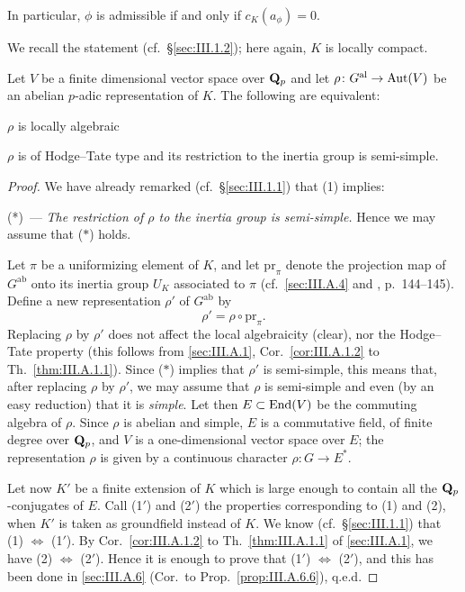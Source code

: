 \begin{exercises}
\begin{nlist}
In particular, $\phi$ is admissible if and only if $c_K(a_\phi)=0$.

\end{nlist}
\end{exercises}


We recall the statement (cf.~\S\ref{sec:III.1.2}); here again, $K$ is
locally compact.

\begin{theorem}[3]\label{thm:III.A.7.3}
Let $V$ be a finite dimensional vector space over $\mathbf{Q}_p$ and let
$\rho\colon G^{\mathrm{al}}\to\mathrm{Aut}(V)$ be an abelian $p$-adic
representation of $K$.  The following are equivalent:
\begin{nlist}
\item[\emph{(1)}] $\rho$ is locally algebraic
\item[\emph{(2)}] $\rho$ is of Hodge--Tate type and its restriction to
the inertia group is semi-simple.
\end{nlist}
\end{theorem}

\begin{proof}
We have already remarked (cf.~\S\ref{sec:III.1.1}) that (1) implies:

{\upshape(*)\ --- \emph{The restriction of $\rho$ to the inertia group
is semi-simple.}}  Hence we may assume that ($*$) holds.

Let $\pi$ be a uniformizing element of $K$, and let
$\mathrm{pr}_\pi$ denote the projection map of $G^{\mathrm{ab}}$ onto
its inertia group $U_K$ associated to $\pi$ (cf.~\ref{sec:III.A.4} and
\cite{cassels-frohlich}, p.~144--145).  Define a new representation
$\rho'$ of $G^{\mathrm{ab}}$ by
\[
\rho'=\rho\circ\mathrm{pr}_\pi.
\]
Replacing $\rho$ by $\rho'$ does not affect the local algebraicity
(clear), nor the Hodge--Tate property (this follows from
\ref{sec:III.A.1}, Cor.~\ref{cor:III.A.1.2} to
Th.~\ref{thm:III.A.1.1}).  Since ($*$) implies that $\rho'$ is
semi-simple, this means that, after replacing $\rho$ by $\rho'$, we may
assume that $\rho$ is semi-simple and even (by an easy reduction) that
it is \emph{simple}.  Let then $E\subset\mathrm{End}(V)$ be the commuting
algebra of $\rho$.  Since $\rho$ is abelian and simple, $E$ is a
commutative field, of finite degree over $\mathbf{Q}_p$, and $V$ is a
one-dimensional vector space over $E$; the representation $\rho$ is
given by a continuous character $\rho\colon G\to E^*$.

Let now $K'$ be a finite extension of $K$ which is large enough to
contain all the $\mathbf{Q}_p$-conjugates of $E$.  Call (1$'$) and (2$'$) the
properties corresponding to (1) and (2), when $K'$ is taken as
groundfield instead of $K$.  We know (cf.~\S\ref{sec:III.1.1}) that
(1) $\Longleftrightarrow$ (1$'$).  By
Cor.~\ref{cor:III.A.1.2} to Th.~\ref{thm:III.A.1.1} of
\ref{sec:III.A.1}, we have (2) $\Longleftrightarrow$ (2$'$).  Hence it
is enough to prove that (1$'$) $\Longleftrightarrow$ (2$'$), and this
has been done in \ref{sec:III.A.6} (Cor.~to
Prop.~\ref{prop:III.A.6.6}), q.e.d.
\end{proof}
